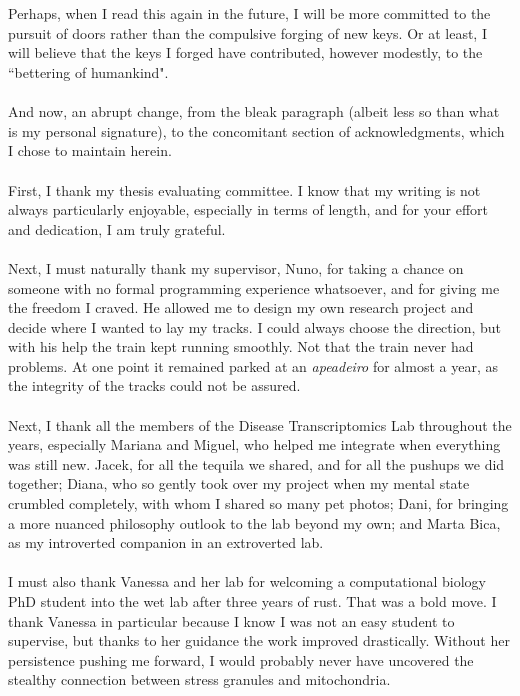 \\
\\
Perhaps, when I read this again in the future, I will be more committed to the pursuit of doors rather than the compulsive forging of new keys. Or at least, I will believe that the keys I forged have contributed, however modestly, to the “bettering of humankind".
\\
\\
And now, an abrupt change, from the bleak paragraph (albeit less so than what is my personal signature), to the concomitant section of acknowledgments, which I chose to maintain herein.
\\
\\
First, I thank my thesis evaluating committee. I know that my writing is not always particularly enjoyable, especially in terms of length, and for your effort and dedication, I am truly grateful. 
\\
\\
Next, I must naturally thank my supervisor, Nuno, for taking a chance on someone with no formal programming experience whatsoever, and for giving me the freedom I craved. He allowed me to design my own research project and decide where I wanted to lay my tracks. I could always choose the direction, but with his help the train kept running smoothly. Not that the train never had problems. At one point it remained parked at an \textit{apeadeiro} for almost a year, as the integrity of the tracks could not be assured.
\\
\\
Next, I thank all the members of the Disease Transcriptomics Lab throughout the years, especially Mariana and Miguel, who helped me integrate when everything was still new. Jacek, for all the tequila we shared, and for all the pushups we did together; Diana, who so gently took over my project when my mental state crumbled completely, with whom I shared so many pet photos; Dani, for bringing a more nuanced philosophy outlook to the lab beyond my own; and Marta Bica, as my introverted companion in an extroverted lab.
\\
\\
I must also thank Vanessa and her lab for welcoming a computational biology PhD student into the wet lab after three years of rust. That was a bold move. I thank Vanessa in particular because I know I was not an easy student to supervise, but thanks to her guidance the work improved drastically. Without her persistence pushing me forward, I would probably never have uncovered the stealthy connection between stress granules and mitochondria.
